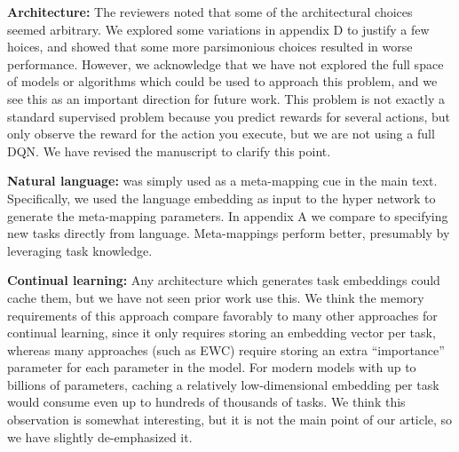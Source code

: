 \documentclass{article}
\begin{document}
\textbf{Architecture:} The reviewers noted that some of the architectural choices seemed arbitrary. We explored some variations in appendix D to justify a few hoices, and showed that some more parsimonious choices resulted in worse performance. However, we acknowledge that we have not explored the full space of models or algorithms which could be used to approach this problem, and we see this as an important direction for future work. This problem is not exactly a standard supervised problem because you predict rewards for several actions, but only observe the reward for the action you execute, but we are not using a full DQN. We have revised the manuscript to clarify this point. \par 
{}
\textbf{Natural language:} was simply used as a meta-mapping cue in the main text. Specifically, we used the language embedding as input to the hyper network to generate the meta-mapping parameters. In appendix A we compare to specifying new tasks directly from language. Meta-mappings perform better, presumably by leveraging task knowledge. \par
{}
\textbf{Continual learning:} Any architecture which generates task embeddings could cache them, but we have not seen prior work use this. We think the memory requirements of this approach compare favorably to many other approaches for continual learning, since it only requires storing an embedding vector per task, whereas many approaches (such as EWC) require storing an extra ``importance'' parameter for each parameter in the model. For modern models with up to billions of parameters, caching a relatively low-dimensional embedding per task would consume even up to hundreds of thousands of tasks. We think this observation is somewhat interesting, but it is not the main point of our article, so we have slightly de-emphasized it. \par
\end{document}
